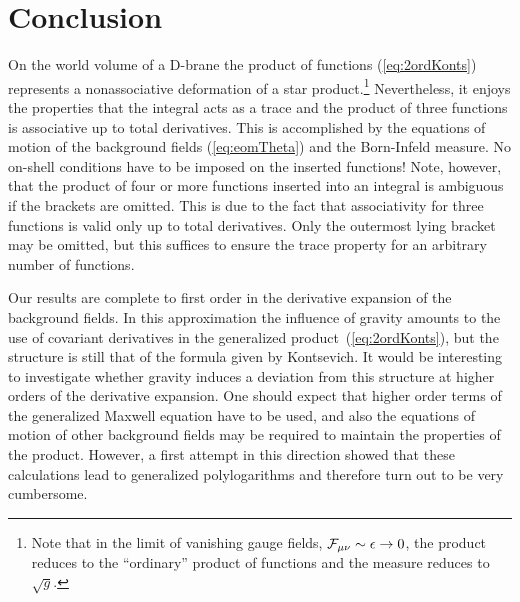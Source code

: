 \documentclass[a4paper,12pt]{article}
\newcommand {\cF} {{\cal F}}
\begin{document}
\section{Conclusion}
\label{sec:concl}

On the world volume of a D-brane the product of functions (\ref{eq:2ordKonts}) 
represents a nonassociative deformation of a star product.\footnote{Note that 
in the limit of vanishing gauge fields, 
$\cF_{\mu\nu}\sim\epsilon\rightarrow 0$, the product reduces to the 
``ordinary'' product of functions and the measure reduces to $\sqrt{g}$.} 
Nevertheless, it 
enjoys the properties that the integral acts as a trace and the product of 
three functions is associative up to total derivatives. This is accomplished 
by the equations of motion of the background fields (\ref{eq:eomTheta}) and 
the Born-Infeld measure. 
No on-shell conditions have to be imposed on the inserted functions! Note, 
however, that the product of four or more functions inserted into an integral 
is ambiguous if the brackets are omitted. This is due to the fact that 
associativity for three functions is valid only up to total derivatives. 
Only the outermost lying bracket may be omitted, but this suffices 
to ensure the trace property for an arbitrary number of functions. 

Our results are complete to first order in the derivative expansion of the
background fields. In this approximation the influence of gravity amounts to 
the use of covariant derivatives in the generalized 
product~(\ref{eq:2ordKonts}), but the structure is still that of the formula 
given by Kontsevich. It would be interesting to investigate whether gravity 
induces a deviation from this structure at higher orders of the derivative 
expansion. One should expect that higher order terms of the generalized 
Maxwell equation have to be used, and also the equations of motion of other
background fields may
be required to maintain the properties of the product. However, a first 
attempt in this direction showed that these calculations lead to generalized 
polylogarithms and therefore turn out to be very cumbersome.
\end{document}
